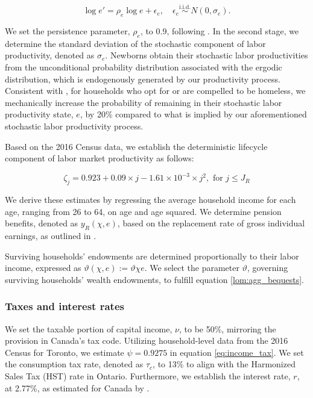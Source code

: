 \documentclass[parskip=full]{article}
\begin{document}
\begin{equation*}
  \log e' = \rho_{e} \log e + \epsilon_{e},\quad \epsilon_{e}\overset{\mathrm{i.i.d.}} \sim N(0,\sigma_{e}).
\end{equation*}

\noindent We set the persistence parameter, $\rho_{e}$, to 0.9, following \citet{gkkoc}. In the second stage, we determine the standard deviation of the stochastic component of labor productivity, denoted as $\sigma_{e}$. Newborns obtain their stochastic labor productivities from the unconditional probability distribution associated with the ergodic distribution, which is endogenously generated by our productivity process. Consistent with \citet{az-2024}, for households who opt for or are compelled to be homeless, we mechanically increase the probability of remaining in their stochastic labor productivity state, $e$, by 20\% compared to what is implied by our aforementioned stochastic labor productivity process.

Based on the 2016 Census data, we establish the deterministic lifecycle component of labor market productivity as follows:

\begin{equation*}
\zeta_j = 0.923+0.09\times j-1.61\times 10^{-3}\times j^{2}, \mbox{ for } j\leq J_{R}
\end{equation*}

\noindent We derive these estimates by regressing the average household income for each age, ranging from 26 to 64, on age and age squared. We determine pension benefits, denoted as ${y_{R}(\chi,e)}$, based on the replacement rate of gross individual earnings, as outlined in \citet{OECD-pension}.

Surviving households' endowments are determined proportionally to their labor income, expressed as $\vartheta(\chi,e):=\vartheta \chi e$. We select the parameter $\vartheta$, governing surviving households' wealth endowments, to fulfill equation \eqref{lom:agg_bequests}.

\subsubsection{Taxes and interest rates}

We set the taxable portion of capital income, $\nu$, to be 50\%, mirroring the provision in Canada's tax code. Utilizing household-level data from the 2016 Census for Toronto, we estimate $\psi=0.9275$ in equation \eqref{eq:income_tax}. We set the consumption tax rate, denoted as $\tau_{c}$, to 13\% to align with the Harmonized Sales Tax (HST) rate in Ontario. Furthermore, we establish the interest rate, $r$, at 2.77\%, as estimated for Canada by \citet{bruneau-etal-2018}.
\end{document}
